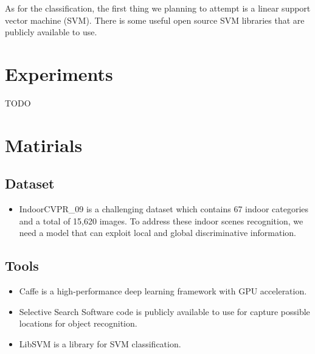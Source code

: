 \documentclass[letterpaper,twocolumn,11pt]{article}
\begin{document}
\par
	As for the classification, the first thing we planning to attempt is a
	linear support vector machine (SVM).\cite{SVM} There is some useful
	open source SVM libraries that are publicly available to use.

\section{Experiments}
TODO

\section{Matirials}
	\subsection{Dataset}
	\begin{itemize}
	\item{IndoorCVPR\_09} is a challenging dataset which contains 67
	indoor categories and a total of 15,620 images. To address these indoor
	scenes recognition, we need a model	that can exploit local and global
	discriminative information.\cite{DATA}
	\end{itemize}
	\subsection{Tools}
	\begin{itemize}
	\item{Caffe} is a high-performance deep learning framework with GPU
	acceleration. \cite{CAFFE}

	\item{Selective Search Software} code is publicly available to use
	for capture possible locations for object recognition. \cite{SS}

	\item{LibSVM} is a library for SVM classification. \cite{SVM}
	\end{itemize}
\end{document}
